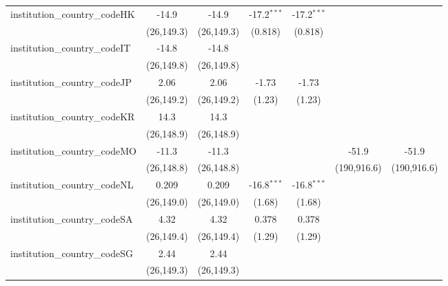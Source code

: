 \begin{tabular}{lcccccc}
   institution\_country\_codeHK          & -14.9        & -14.9        & -17.2$^{***}$ & -17.2$^{***}$ &             &   \\   
                                         & (26,149.3)   & (26,149.3)   & (0.818)       & (0.818)       &             &   \\   
   institution\_country\_codeIT          & -14.8        & -14.8        &               &               &             &   \\   
                                         & (26,149.8)   & (26,149.8)   &               &               &             &   \\   
   institution\_country\_codeJP          & 2.06         & 2.06         & -1.73         & -1.73         &             &   \\   
                                         & (26,149.2)   & (26,149.2)   & (1.23)        & (1.23)        &             &   \\   
   institution\_country\_codeKR          & 14.3         & 14.3         &               &               &             &   \\   
                                         & (26,148.9)   & (26,148.9)   &               &               &             &   \\   
   institution\_country\_codeMO          & -11.3        & -11.3        &               &               & -51.9       & -51.9\\   
                                         & (26,148.8)   & (26,148.8)   &               &               & (190,916.6) & (190,916.6)\\   
   institution\_country\_codeNL          & 0.209        & 0.209        & -16.8$^{***}$ & -16.8$^{***}$ &             &   \\   
                                         & (26,149.0)   & (26,149.0)   & (1.68)        & (1.68)        &             &   \\   
   institution\_country\_codeSA          & 4.32         & 4.32         & 0.378         & 0.378         &             &   \\   
                                         & (26,149.4)   & (26,149.4)   & (1.29)        & (1.29)        &             &   \\   
   institution\_country\_codeSG          & 2.44         & 2.44         &               &               &             &   \\   
                                         & (26,149.3)   & (26,149.3)   &               &               &             &   \\   

\end{tabular}
